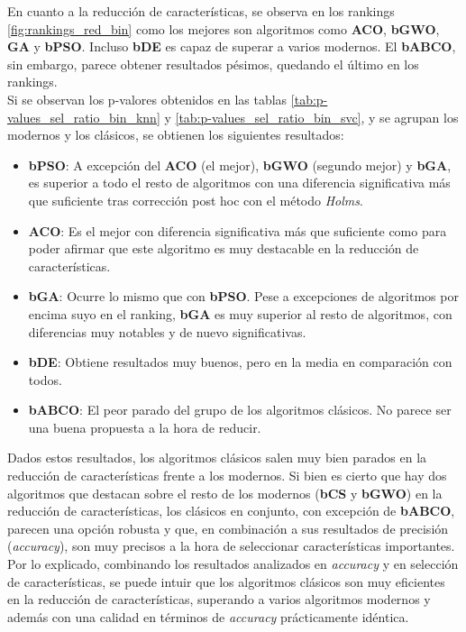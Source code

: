 En cuanto a la reducción de características, se observa en los rankings \ref{fig:rankings_red_bin} como los mejores son algoritmos como \textbf{ACO}, \textbf{bGWO}, \textbf{GA} y \textbf{bPSO}. Incluso \textbf{bDE} es capaz de superar a varios modernos. El \textbf{bABCO}, sin embargo, parece obtener resultados pésimos, quedando el último en los rankings.\\[6pt]
Si se observan los p-valores obtenidos en las tablas \ref{tab:p-values_sel_ratio_bin_knn} y \ref{tab:p-values_sel_ratio_bin_svc}, y se agrupan los modernos y los clásicos, se obtienen los siguientes resultados:
\begin{itemize}
    \item \textbf{bPSO}: A excepción del \textbf{ACO} (el mejor), \textbf{bGWO} (segundo mejor) y \textbf{bGA}, es superior a todo el resto de algoritmos con una diferencia significativa más que suficiente tras corrección post hoc con el método \textit{Holms}.
    \item \textbf{ACO}: Es el mejor con diferencia significativa más que suficiente como para poder afirmar que este algoritmo es muy destacable en la reducción de características.
    \item \textbf{bGA}: Ocurre lo mismo que con \textbf{bPSO}. Pese a excepciones de algoritmos por encima suyo en el ranking, \textbf{bGA} es muy superior al resto de algoritmos, con diferencias muy notables y de nuevo significativas.
    \item \textbf{bDE}: Obtiene resultados muy buenos, pero en la media en comparación con todos.
    \item \textbf{bABCO}: El peor parado del grupo de los algoritmos clásicos. No parece ser una buena propuesta a la hora de reducir.
\end{itemize}

Dados estos resultados, los algoritmos clásicos salen muy bien parados en la reducción de características frente a los modernos. Si bien es cierto que hay dos algoritmos que destacan sobre el resto de los modernos (\textbf{bCS} y \textbf{bGWO}) en la reducción de características, los clásicos en conjunto, con excepción de \textbf{bABCO}, parecen una opción robusta y que, en combinación a sus resultados de precisión (\textit{accuracy}), son muy precisos a la hora de seleccionar características importantes. \\[6pt]

Por lo explicado, combinando los resultados analizados en \textit{accuracy} y en selección de características, se puede intuir que los algoritmos clásicos son muy eficientes en la reducción de características, superando a varios algoritmos modernos y además con una calidad en términos de \textit{accuracy} prácticamente idéntica.

